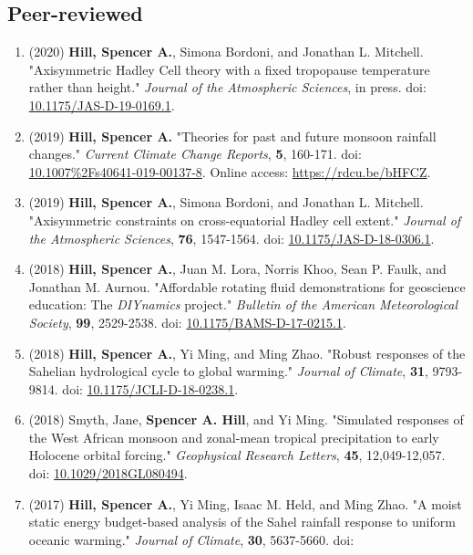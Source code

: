 \documentclass[12pt,letterpaper]{shillcv}
\begin{document}
\subsection*{Peer-reviewed}
\label{sec:org472a3bc}
\begin{enumerate}
\item (2020) \textbf{Hill, Spencer A.}, Simona Bordoni, and Jonathan L. Mitchell.
"Axisymmetric Hadley Cell theory with a fixed tropopause temperature rather
than height."  \emph{Journal of the Atmospheric Sciences}, in press.  doi:
\href{https://doi.org/10.1175/JAS-D-19-0169.1}{10.1175/JAS-D-19-0169.1}.
\item (2019) \textbf{Hill, Spencer A.} "Theories for past and future monsoon rainfall
changes."  \emph{Current Climate Change Reports}, \textbf{5}, 160-171.  doi:
\href{https://doi.org/10.1007\%2Fs40641-019-00137-8}{10.1007\%2Fs40641-019-00137-8}.  Online access: \url{https://rdcu.be/bHFCZ}.
\item (2019) \textbf{Hill, Spencer A.}, Simona Bordoni, and Jonathan L. Mitchell.
"Axisymmetric constraints on cross-equatorial Hadley cell extent."
\emph{Journal of the Atmospheric Sciences}, \textbf{76}, 1547-1564.  doi: \href{https://doi.org/10.1175/JAS-D-18-0306.1}{10.1175/JAS-D-18-0306.1}.
\item (2018) \textbf{Hill, Spencer A.}, Juan M. Lora, Norris Khoo, Sean P. Faulk, and
Jonathan M.  Aurnou.  "Affordable rotating fluid demonstrations for
geoscience education: The \emph{DIYnamics} project."  \emph{Bulletin of the
American Meteorological Society}, \textbf{99}, 2529-2538.  doi:
\href{https://doi.org/10.1175/BAMS-D-17-0215.1}{10.1175/BAMS-D-17-0215.1}.
\item (2018) \textbf{Hill, Spencer A.}, Yi Ming, and Ming Zhao.  "Robust responses of the
Sahelian hydrological cycle to global warming."  \emph{Journal of
Climate}, \textbf{31}, 9793-9814.  doi: \href{https://doi.org/10.1175/JCLI-D-18-0238.1}{10.1175/JCLI-D-18-0238.1}.
\item (2018) Smyth, Jane, \textbf{Spencer A. Hill}, and Yi Ming.  "Simulated responses of
the West African monsoon and zonal-mean tropical precipitation to early
Holocene orbital forcing."  \emph{Geophysical Research Letters}, \textbf{45},
12,049-12,057.  doi: \href{https://doi.org/10.1029/2018GL080494}{10.1029/2018GL080494}.
\item (2017) \textbf{Hill, Spencer A.}, Yi Ming, Isaac M. Held, and Ming Zhao.  "A moist
static energy budget-based analysis of the Sahel rainfall response to uniform
oceanic warming."  \emph{Journal of Climate}, \textbf{30}, 5637-5660.  doi:

\end{enumerate}
\end{document}
